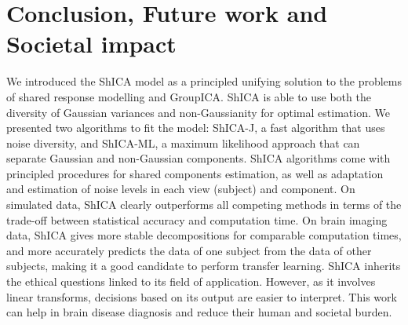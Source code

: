 \documentclass[12pt]{report}
\begin{document}

\section{Conclusion, Future work and Societal impact}
We introduced the ShICA model as a principled unifying solution to the problems of shared response modelling and GroupICA. ShICA is able to use both the diversity of Gaussian variances and non-Gaussianity for optimal estimation. We presented two algorithms to fit the model: ShICA-J, a fast algorithm that uses noise diversity, and ShICA-ML, a maximum likelihood approach that can separate Gaussian and non-Gaussian components. ShICA algorithms come with principled procedures for shared components estimation, as well as adaptation and estimation of noise levels in each view (subject) and component. On simulated data, ShICA clearly outperforms all competing methods in terms of the trade-off between statistical accuracy and computation time. On brain imaging data, ShICA gives more stable decompositions for comparable computation times, and more accurately predicts the data of one subject from the data of other subjects, making it a good candidate to perform transfer learning. ShICA inherits the ethical questions linked to its field of application. However, as it involves linear transforms, decisions based on its output are easier to interpret. This work can help in brain disease diagnosis and reduce their human and societal burden.

\end{document}
